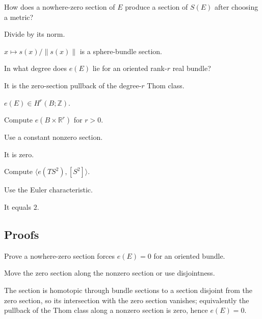 \begin{exercise}\label{exr:viii32-ped-02}
How does a nowhere-zero section of $E$ produce a section of $S(E)$ after choosing a metric?
\end{exercise}
\begin{hint}
Divide by its norm.
\end{hint}
\begin{solution}
$x\mapsto s(x)/\|s(x)\|$ is a sphere-bundle section.
\end{solution}

\begin{exercise}\label{exr:viii32-ped-03}
In what degree does $e(E)$ lie for an oriented rank-$r$ real bundle?
\end{exercise}
\begin{hint}
It is the zero-section pullback of the degree-$r$ Thom class.
\end{hint}
\begin{solution}
$e(E)\in H^r(B;\mathbb Z)$.
\end{solution}

\begin{exercise}\label{exr:viii32-ped-04}
Compute $e(B\times\mathbb R^r)$ for $r>0$.
\end{exercise}
\begin{hint}
Use a constant nonzero section.
\end{hint}
\begin{solution}
It is zero.
\end{solution}

\begin{exercise}\label{exr:viii32-ped-05}
Compute $\langle e(TS^2),[S^2]\rangle$.
\end{exercise}
\begin{hint}
Use the Euler characteristic.
\end{hint}
\begin{solution}
It equals $2$.
\end{solution}

\subsection*{Proofs}

\begin{exercise}\label{exr:viii32-ped-06}
Prove a nowhere-zero section forces $e(E)=0$ for an oriented bundle.
\end{exercise}
\begin{hint}
Move the zero section along the nonzero section or use disjointness.
\end{hint}
\begin{solution}
The section is homotopic through bundle sections to a section disjoint from the zero section, so its intersection with the zero section vanishes; equivalently the pullback of the Thom class along a nonzero section is zero, hence $e(E)=0$.
\end{solution}

